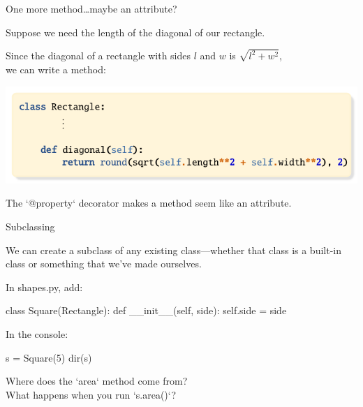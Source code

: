 \documentclass[aspectratio=149, handout] {beamer}
\begin{document}
\begin{frame}[fragile]{One more method\dots maybe an attribute?}
  
  Suppose we need the length of the diagonal of our rectangle.
  
  \pause \smallskip
  
  Since the diagonal of a rectangle with sides $l$ and $w$ 
  is $\sqrt{l^2 + w^2}$,\\[-1pt]
  we can write a method:
  
  \smallskip \pause
   
  \includegraphics[page=2]{diagonal}
  
  The \inline`@property` decorator makes a method seem like an
  attribute.
  
  
\end{frame}




\begin{frame}[fragile]{Subclassing}

  We can create a subclass of any existing class---whether that class is a built-in class or something that we've made ourselves.

  \medskip \pause

  In shapes.py, add:
  \begin{pythoncode}
    class Square(Rectangle):
        def __init__(self, side):
            self.side = side
  \end{pythoncode}

  \medskip \pause

  In the console:
  \begin{pythoncode}
    s = Square(5)
    dir(s)
  \end{pythoncode}

  \pause

  Where does the \inline`area` method come from? \\
  What happens when you run \inline`s.area()`?

\end{frame}
\end{document}

